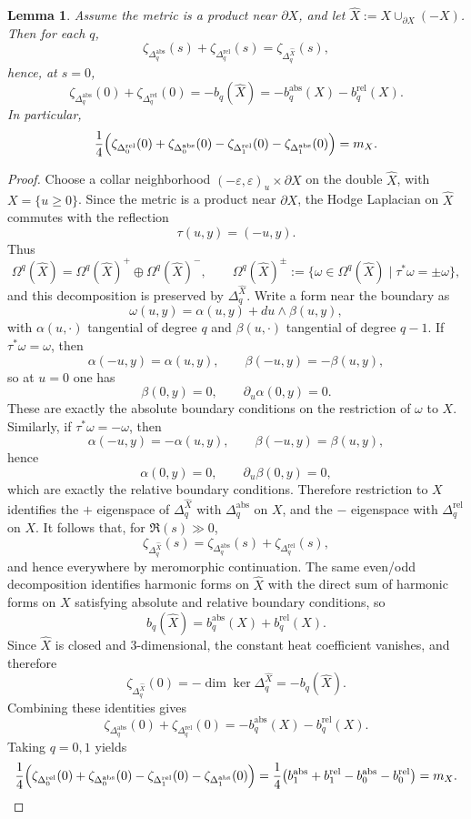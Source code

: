 \documentclass[12pt]{amsart}
\numberwithin{equation}{section}
\newtheorem{lemma}[theorem]{Lemma}
\begin{document}
\begin{lemma}\label{lem:boundary-zeta-sum}
Assume the metric is a product near $\partial X$, and let $\widehat X:=X\cup_{\partial X}(-X)$. Then for each $q$,
\[
\zeta_{\Delta_q^{\mathrm{abs}}}(s)+\zeta_{\Delta_q^{\mathrm{rel}}}(s)
=
\zeta_{\Delta_q^{\widehat X}}(s),
\]
hence, at $s=0$,
\[
\zeta_{\Delta_q^{\mathrm{abs}}}(0)+\zeta_{\Delta_q^{\mathrm{rel}}}(0)
=
-b_q(\widehat X)
=
-b_q^{\mathrm{abs}}(X)-b_q^{\mathrm{rel}}(X).
\]
In particular,
\[
\frac14\Bigl(
\zeta_{\Delta_0^{\mathrm{rel}}}(0)+\zeta_{\Delta_0^{\mathrm{abs}}}(0)
-
\zeta_{\Delta_1^{\mathrm{rel}}}(0)-\zeta_{\Delta_1^{\mathrm{abs}}}(0)
\Bigr)
=
m_X.
\]
\end{lemma}

\begin{proof}
Choose a collar neighborhood $(-\varepsilon,\varepsilon)_u\times \partial X$ on the double
$\widehat X$, with $X=\{u\ge 0\}$. Since the metric is a product near $\partial X$, the
Hodge Laplacian on $\widehat X$ commutes with the reflection
\[
\tau(u,y)=(-u,y).
\]
Thus
\[
\Omega^q(\widehat X)
=
\Omega^q(\widehat X)^+
\oplus
\Omega^q(\widehat X)^-,
\qquad
\Omega^q(\widehat X)^\pm
:=
\{\omega\in\Omega^q(\widehat X)\mid \tau^*\omega=\pm\omega\},
\]
and this decomposition is preserved by $\Delta_q^{\widehat X}$. Write a form near the boundary as
\[
\omega(u,y)=\alpha(u,y)+du\wedge \beta(u,y),
\]
with $\alpha(u,\cdot)$ tangential of degree $q$ and $\beta(u,\cdot)$ tangential of degree
$q-1$. If $\tau^*\omega=\omega$, then
\[
\alpha(-u,y)=\alpha(u,y),
\qquad
\beta(-u,y)=-\beta(u,y),
\]
so at $u=0$ one has
\[
\beta(0,y)=0,
\qquad
\partial_u\alpha(0,y)=0.
\]
These are exactly the absolute boundary conditions on the restriction of $\omega$ to $X$.
Similarly, if $\tau^*\omega=-\omega$, then
\[
\alpha(-u,y)=-\alpha(u,y),
\qquad
\beta(-u,y)=\beta(u,y),
\]
hence
\[
\alpha(0,y)=0,
\qquad
\partial_u\beta(0,y)=0,
\]
which are exactly the relative boundary conditions. Therefore restriction to $X$ identifies the $+$ eigenspace of
$\Delta_q^{\widehat X}$ with $\Delta_q^{\mathrm{abs}}$ on $X$, and the $-$ eigenspace with
$\Delta_q^{\mathrm{rel}}$ on $X$. It follows that, for $\Re(s)\gg 0$,
\[
\zeta_{\Delta_q^{\widehat X}}(s)
=
\zeta_{\Delta_q^{\mathrm{abs}}}(s)
+
\zeta_{\Delta_q^{\mathrm{rel}}}(s),
\]
and hence everywhere by meromorphic continuation. The same even/odd decomposition identifies harmonic forms on $\widehat X$ with the direct
sum of harmonic forms on $X$ satisfying absolute and relative boundary conditions, so
\[
b_q(\widehat X)=b_q^{\mathrm{abs}}(X)+b_q^{\mathrm{rel}}(X).
\]
Since $\widehat X$ is closed and $3$-dimensional, the constant heat coefficient vanishes, and
therefore
\[
\zeta_{\Delta_q^{\widehat X}}(0)
=
-\dim\ker \Delta_q^{\widehat X}
=
-b_q(\widehat X).
\]
Combining these identities gives
\[
\zeta_{\Delta_q^{\mathrm{abs}}}(0)+\zeta_{\Delta_q^{\mathrm{rel}}}(0)
=
-b_q^{\mathrm{abs}}(X)-b_q^{\mathrm{rel}}(X).
\]
Taking $q=0,1$ yields
\[
\frac14\Bigl(
\zeta_{\Delta_0^{\mathrm{rel}}}(0)+\zeta_{\Delta_0^{\mathrm{abs}}}(0)
-
\zeta_{\Delta_1^{\mathrm{rel}}}(0)-\zeta_{\Delta_1^{\mathrm{abs}}}(0)
\Bigr)
=
\frac14\bigl(
b_1^{\mathrm{abs}}+b_1^{\mathrm{rel}}-b_0^{\mathrm{abs}}-b_0^{\mathrm{rel}}
\bigr)
=
m_X.
\]
\end{proof}
\end{document}
